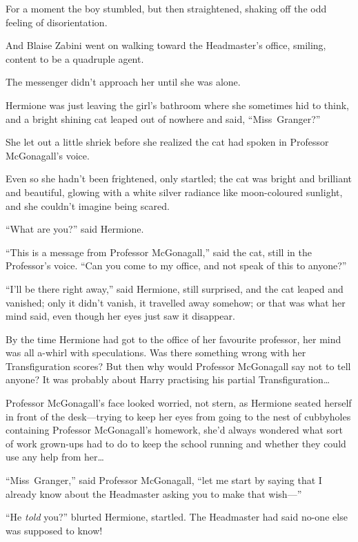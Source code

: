 For a moment the boy stumbled, but then straightened, shaking off the odd feeling of disorientation.

And Blaise Zabini went on walking toward the Headmaster’s office, smiling, content to be a quadruple agent.


The messenger didn’t approach her until she was alone.

Hermione was just leaving the girl’s bathroom where she sometimes hid to think, and a bright shining cat leaped out of nowhere and said, “Miss~Granger?”

She let out a little shriek before she realized the cat had spoken in Professor McGonagall’s voice.

Even so she hadn’t been frightened, only startled; the cat was bright and brilliant and beautiful, glowing with a white silver radiance like moon-coloured sunlight, and she couldn’t imagine being scared.

“What are you?” said Hermione.

“This is a message from Professor McGonagall,” said the cat, still in the Professor’s voice. “Can you come to my office, and not speak of this to anyone?”

“I’ll be there right away,” said Hermione, still surprised, and the cat leaped and vanished; only it didn’t vanish, it travelled away somehow; or that was what her mind said, even though her eyes just saw it disappear.

By the time Hermione had got to the office of her favourite professor, her mind was all a-whirl with speculations. Was there something wrong with her Transfiguration scores? But then why would Professor McGonagall say not to tell anyone? It was probably about Harry practising his partial Transfiguration…

Professor McGonagall’s face looked worried, not stern, as Hermione seated herself in front of the desk—trying to keep her eyes from going to the nest of cubbyholes containing Professor McGonagall’s homework, she’d always wondered what sort of work grown-ups had to do to keep the school running and whether they could use any help from her…

“Miss~Granger,” said Professor McGonagall, “let me start by saying that I already know about the Headmaster asking you to make that wish—”

“He \emph{told} you?” blurted Hermione, startled. The Headmaster had said no-one else was supposed to know!

